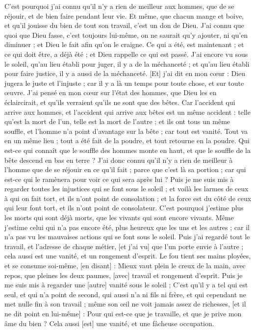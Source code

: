 \begin{multicols}{2}
C'est pourquoi j'ai connu qu'il n'y a rien de meilleur aux hommes, que de se réjouir, et de bien faire pendant leur vie.
Et même, que chacun mange et boive, et qu'il jouisse du bien de tout son travail, c'est un don de Dieu.
J'ai connu que quoi que Dieu fasse, c'est toujours lui-même, on ne saurait qu'y ajouter, ni qu'en diminuer ; et Dieu le fait afin qu'on le craigne.
Ce qui a été, est maintenant ; et ce qui doit être, a déjà été ; et Dieu rappelle ce qui est passé.
J'ai encore vu sous le soleil, qu'au lieu établi pour juger, il y a de la méchanceté ; et qu'au lieu établi pour faire justice, il y a aussi de la méchanceté.
[Et] j'ai dit en mon cœur : Dieu jugera le juste et l'injuste ; car il y a là un temps pour toute chose, et sur toute œuvre.
J'ai pensé en mon cœur sur l'état des hommes, que Dieu les en éclaircirait, et qu'ils verraient qu'ils ne sont que des bêtes.
Car l'accident qui arrive aux hommes, et l'accident qui arrive aux bêtes est un même accident : telle qu'est la mort de l'un, telle est la mort de l'autre ; et ils ont tous un même souffle, et l'homme n'a point d'avantage sur la bête ; car tout est vanité.
Tout va en un même lieu ; tout a été fait de la poudre, et tout retourne en la poudre.
Qui est-ce qui connaît que le souffle des hommes monte en haut, et que le souffle de la bête descend en bas en terre ?
J'ai donc connu qu'il n'y a rien de meilleur à l'homme que de se réjouir en ce qu'il fait ; parce que c'est là sa portion ; car qui est-ce qui le ramènera pour voir ce qui sera après lui ?
\VerseOne{}Puis je me suis mis à regarder toutes les injustices qui se font sous le soleil ; et voilà les larmes de ceux à qui on fait tort, et ils n'ont point de consolation ; et la force est du côté de ceux qui leur font tort, et ils n'ont point de consolateur.
C'est pourquoi j'estime plus les morts qui sont déjà morts, que les vivants qui sont encore vivants.
Même j'estime celui qui n'a pas encore été, plus heureux que les uns et les autres ; car il n'a pas vu les mauvaises actions qui se font sous le soleil.
Puis j'ai regardé tout le travail, et l'adresse de chaque métier, [et j'ai vu] que l'un porte envie à l'autre ; cela aussi est une vanité, et un rongement d'esprit.
Le fou tient ses mains ployées, et se consume soi-même, [en disant] :
Mieux vaut plein le creux de la main, avec repos, que pleines les deux paumes, [avec] travail et rongement d'esprit.
Puis je me suis mis à regarder une [autre] vanité sous le soleil ;
C'est qu'il y a tel qui est seul, et qui n'a point de second, qui aussi n'a ni fils ni frère, et qui cependant ne met nulle fin à son travail ; même son œil ne voit jamais assez de richesses, [et il ne dit point en lui-même] : Pour qui est-ce que je travaille, et que je prive mon âme du bien ? Cela aussi [est] une vanité, et une fâcheuse occupation.

\end{multicols}
